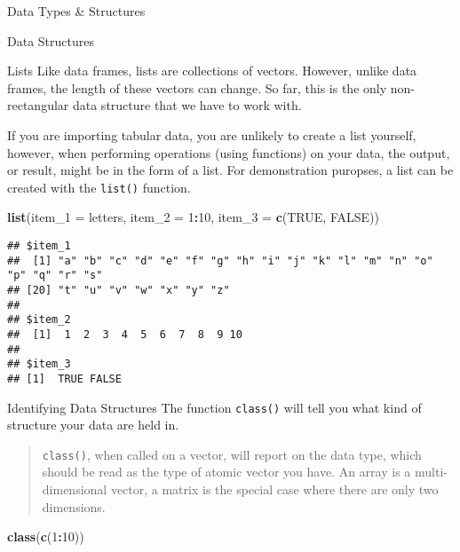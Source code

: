 \documentclass[
  ignorenonframetext,
]{beamer}
\newenvironment{Shaded}{\begin{snugshade}}{\end{snugshade}}
\newcommand{\AttributeTok}[1]{\textcolor[rgb]{0.13,0.29,0.53}{#1}}
\newcommand{\ConstantTok}[1]{\textcolor[rgb]{0.56,0.35,0.01}{#1}}
\newcommand{\DecValTok}[1]{\textcolor[rgb]{0.00,0.00,0.81}{#1}}
\newcommand{\FunctionTok}[1]{\textcolor[rgb]{0.13,0.29,0.53}{\textbf{#1}}}
\newcommand{\NormalTok}[1]{#1}
\newcommand{\SpecialCharTok}[1]{\textcolor[rgb]{0.81,0.36,0.00}{\textbf{#1}}}
\begin{document}
\begin{frame}[fragile]{Data Types \& Structures}
\begin{block}{Data Structures}
\begin{block}{Lists}
\protect\hypertarget{lists}{}
Like data frames, lists are collections of vectors. However, unlike data
frames, the length of these vectors can change. So far, this is the only
non-rectangular data structure that we have to work with.

If you are importing tabular data, you are unlikely to create a list
yourself, however, when performing operations (using functions) on your
data, the output, or result, might be in the form of a list. For
demonstration puropses, a list can be created with the \texttt{list()}
function.

\begin{Shaded}
\begin{Highlighting}[]
\FunctionTok{list}\NormalTok{(}\AttributeTok{item\_1 =}\NormalTok{ letters,}
     \AttributeTok{item\_2 =} \DecValTok{1}\SpecialCharTok{:}\DecValTok{10}\NormalTok{,}
     \AttributeTok{item\_3 =} \FunctionTok{c}\NormalTok{(}\ConstantTok{TRUE}\NormalTok{, }\ConstantTok{FALSE}\NormalTok{))}
\end{Highlighting}
\end{Shaded}

\begin{verbatim}
## $item_1
##  [1] "a" "b" "c" "d" "e" "f" "g" "h" "i" "j" "k" "l" "m" "n" "o" "p" "q" "r" "s"
## [20] "t" "u" "v" "w" "x" "y" "z"
## 
## $item_2
##  [1]  1  2  3  4  5  6  7  8  9 10
## 
## $item_3
## [1]  TRUE FALSE
\end{verbatim}
\end{block}

\begin{block}{Identifying Data Structures}
\protect\hypertarget{identifying-data-structures}{}
The function \texttt{class()} will tell you what kind of structure your
data are held in.

\begin{quote}
\texttt{class()}, when called on a vector, will report on the data type,
which should be read as the type of atomic vector you have. An array is
a multi-dimensional vector, a matrix is the special case where there are
only two dimensions.
\end{quote}

\begin{Shaded}
\begin{Highlighting}[]
\FunctionTok{class}\NormalTok{(}\FunctionTok{c}\NormalTok{(}\DecValTok{1}\SpecialCharTok{:}\DecValTok{10}\NormalTok{))}
\end{Highlighting}
\end{Shaded}


\end{block}
\end{block}
\end{frame}
\end{document}
